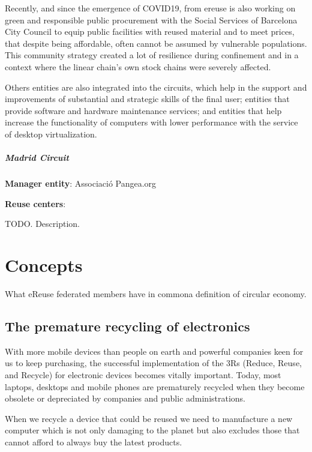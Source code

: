 \documentclass[
]{book}
\begin{document}
Recently, and since the emergence of COVID19, from ereuse is also working on green and responsible public procurement with the Social Services of Barcelona City Council to equip public facilities with reused material and to meet prices, that despite being affordable, often cannot be assumed by vulnerable populations. This community strategy created a lot of resilience during confinement and in a context where the linear chain's own stock chains were severely affected.

Others entities are also integrated into the circuits, which help in the support and improvements of substantial and strategic skills of the final user; entities that provide software and hardware maintenance services; and entities that help increase the functionality of computers with lower performance with the service of desktop virtualization.

\hypertarget{madrid-circuit}{%
\paragraph{Madrid Circuit}\label{madrid-circuit}}

\textbf{Manager entity}: Associació Pangea.org

\textbf{Reuse centers}:

TODO. Description.

\hypertarget{concepts}{%
\chapter{Concepts}\label{concepts}}

What eReuse federated members have in commona definition of circular economy.

\hypertarget{the-premature-recycling-of-electronics}{%
\section{The premature recycling of electronics}\label{the-premature-recycling-of-electronics}}

With more mobile devices than people on earth and powerful companies keen for us to keep purchasing, the successful implementation of the 3Rs (Reduce, Reuse, and Recycle) for electronic devices becomes vitally important. Today, most laptops, desktops and mobile phones are prematurely recycled when they become obsolete or depreciated by companies and public administrations.

When we recycle a device that could be reused we need to manufacture a new computer which is not only damaging to the planet but also excludes those that cannot afford to always buy the latest products.
\end{document}
